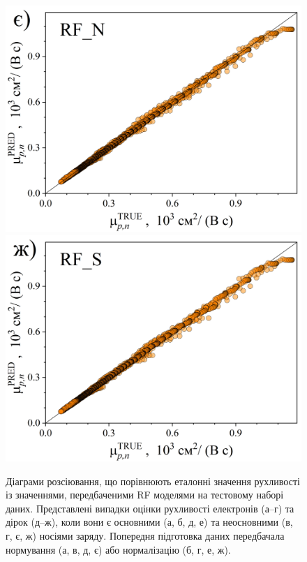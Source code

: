 \documentclass[12pt,a4paper,titlepage,oneside]{book}
\numberwithin{equation}{part}
\begin{document}
\begin{figure}
     \includegraphics[width=0.35\linewidth]{RFNpn.png}\kern 20pt
     \includegraphics[width=0.35\linewidth]{RFSpn.png}
	  \caption{Діаграми розсіювання, що порівнюють еталонні значення рухливості із значеннями, передбаченими RF моделями
       на тестовому наборі даних.
       Представлені випадки оцінки рухливості електронів (а--г) та дірок (д--ж), коли вони є
       основними (а, б, д, е) та неосновними (в, г, є, ж) носіями заряду.
       Попередня підготовка даних передбачала нормування (а, в, д, є) або нормалізацію (б, г, е, ж).
}\label{figRF}
\end{figure}
\end{document}
